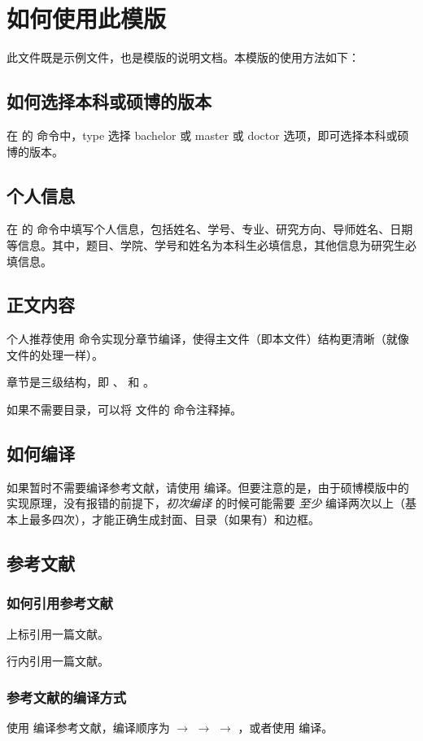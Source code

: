 
\section{如何使用此模版}

此文件既是示例文件，也是模版的说明文档。本模版的使用方法如下：

\subsection{如何选择本科或硕博的版本}

在  的  命令中，type 选择 bachelor 或 master 或 doctor 选项，即可选择本科或硕博的版本。


\subsection{个人信息}

在  的  命令中填写个人信息，包括姓名、学号、专业、研究方向、导师姓名、日期等信息。其中，题目、学院、学号和姓名为本科生必填信息，其他信息为研究生必填信息。


\subsection{正文内容}

个人推荐使用  命令实现分章节编译，使得主文件（即本文件）结构更清晰（就像  文件的处理一样）。

章节是三级结构，即 、 和 。

如果不需要目录，可以将  文件的  命令注释掉。


\subsection{如何编译}

如果暂时不需要编译参考文献，请使用  编译。但要注意的是，由于硕博模版中的实现原理，没有报错的前提下，\emph{初次编译} 的时候可能需要 \emph{至少} 编译两次以上（基本上最多四次），才能正确生成封面、目录（如果有）和边框。


\subsection{参考文献}

\subsubsection{如何引用参考文献}

上标引用一篇文献\cite{研究生学位论文开题报告登记表}。

行内引用一篇文献\parencite{研究生学位论文开题报告登记表}。


\subsubsection{参考文献的编译方式}

使用  编译参考文献，编译顺序为  $\to$  $\to$  $\to$ ，或者使用  编译。